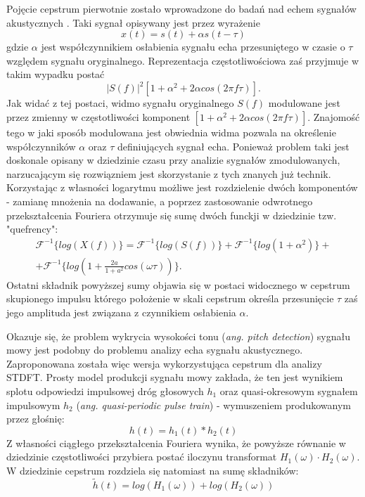 Pojęcie cepstrum pierwotnie zostało wprowadzone do badań nad echem sygnałów akustycznych \cite{hdsp}. Taki sygnał opisywany jest przez wyrażenie 
\begin{equation}
     x(t) = s(t) + \alpha s(t - \tau) 
\end{equation} 
gdzie $ \alpha $ jest współczynnikiem osłabienia sygnału echa przesuniętego w czasie o $ \tau $ względem sygnału oryginalnego. Reprezentacja częstotliwościowa zaś przyjmuje w takim wypadku postać 
\begin{equation}
    |S(f)|^2\left[ 1+ \alpha^2+2\alpha cos(2\pi f\tau)\right].
\end{equation}
Jak widać z tej postaci, widmo sygnału oryginalnego $S(f)$ modulowane jest przez zmienny w częstotliwości komponent $[1 + \alpha^2 + 2\alpha cos(2\pi f \tau)]$. Znajomość tego w jaki sposób modulowana jest obwiednia widma pozwala na określenie współczynników $\alpha$  oraz $\tau$ definiujących sygnał echa. Ponieważ problem taki jest doskonale opisany w dziedzinie czasu przy analizie sygnałów zmodulowanych, narzucającym się rozwiązniem jest skorzystanie z tych znanych już technik. Korzystając z własności logarytmu możliwe jest rozdzielenie dwóch komponentów - zamianę mnożenia na dodawanie, a poprzez zastosowanie odwrotnego przekształcenia Fouriera otrzymuje się sumę dwóch funckji w dziedzinie tzw. "quefrency": 
\begin{equation}
    \begin{split}
    \mathcal{F}^{-1}\{log(X(f))\} =   \mathcal{F}^{-1}\{log(S(f))\} + \mathcal{F}^{-1}\{log(1+\alpha^2)\} + \\ + \mathcal{F}^{-1}\{log(1+\frac{2a}{1+a^2} cos(\omega \tau))\}.
    \end{split}
\end{equation}
Ostatni składnik powyższej sumy objawia się w postaci widocznego w cepstrum skupionego impulsu którego położenie w skali cepstrum określa przesunięcie $\tau$ zaś jego amplituda jest związana z czynnikiem osłabienia $\alpha$. 

Okazuje się, że problem wykrycia wysokości tonu (\textit{ang. pitch detection}) sygnału mowy jest podobny do problemu analizy echa sygnału akustycznego. Zaproponowana została więc wersja wykorzystująca cepstrum dla analizy STDFT\cite{noll}. Prosty model produkcji sygnału mowy zakłada, że ten jest wynikiem splotu odpowiedzi impulsowej dróg głosowych $h_1$ oraz quasi-okresowym sygnałem impulsowym $h_2$ (\textit{ang. quasi-periodic pulse train}) - wymuszeniem produkowanym przez głośnię:
\begin{equation}
    h(t) = h_1(t)*h_2(t)
\end{equation}
Z własności ciągłego przekształcenia Fouriera wynika, że powyższe równanie w dziedzinie częstotliwości przybiera postać iloczynu transformat $H_1(\omega) \cdot H_2(\omega)$. W dziedzinie cepstrum rozdziela się natomiast na sumę składników:
\begin{equation}
    \tilde{h}(t) = log(H_1(\omega)) + log(H_2(\omega))
\end{equation}

